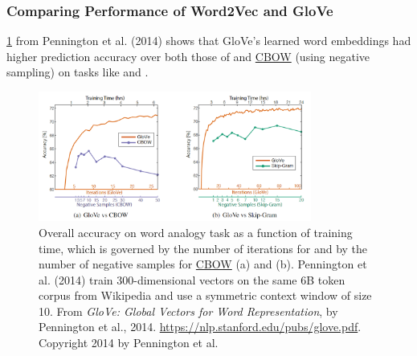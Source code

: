 \subsubsection{Comparing Performance of Word2Vec and GloVe}

\cref{fig:gloveVsWord2vec} from Pennington et al. (2014) shows that GloVe's learned word embeddings had higher prediction accuracy over both those of  and \hyperref[sec:CBOW]{CBOW} (using negative sampling) on tasks like  and . 

\begin{figure}[h]
\vspace{-5pt}
\centering
\includegraphics[width=0.8\textwidth]{imgs/table_gloveVSword2vec.png}
\vspace{-5pt}
\caption{\footnotesize Overall accuracy on word analogy task as a function of training time, which is governed by the number of iterations for  and by the number of negative samples for \hyperref[sec:CBOW]{CBOW} (a) and  (b). Pennington et al. (2014) train 300-dimensional vectors on the same 6B token corpus from Wikipedia and use a symmetric context window of size 10. From \emph{GloVe: Global Vectors for Word Representation}, by Pennington et al., 2014. \url{https://nlp.stanford.edu/pubs/glove.pdf}. Copyright 2014 by Pennington et al.}
\vspace{-5pt}
\label{fig:gloveVsWord2vec}
\end{figure}